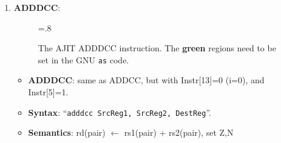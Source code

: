 \begin{enumerate}
\item \textbf{ADDDCC}:\\
  \begin{center}
    \begin{figure}[h]
      \centering
      \epsfxsize=.8\linewidth
      \caption{The   AJIT   ADDDCC   instruction.    The   {\darkgreen
          {\textbf{green}}}  regions  need  to   be  set  in  the  GNU
        \texttt{as} code.}
      \label{fig:ajit:adddcc:insn}
    \end{figure}
  \end{center}

  \begin{itemize}
  \item []\textbf{ADDDCC}: same as ADDCC, but with Instr[13]=0 (i=0), and
    Instr[5]=1.
  \item []\textbf{Syntax}: ``\texttt{adddcc  SrcReg1, SrcReg2, DestReg}''.
  \item []\textbf{Semantics}: rd(pair) $\leftarrow$ rs1(pair) + rs2(pair), set Z,N
  \end{itemize}


\end{enumerate}
